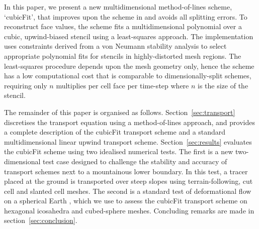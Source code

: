 In this paper, we present a new multidimensional method-of-lines scheme, `cubicFit', that improves upon the scheme in \citep{weller-shahrokhi2014} and avoids all splitting errors.  To reconstruct face values, the scheme fits a multidimensional polynomial over a cubic, upwind-biased stencil using a least-squares approach.  The implementation uses constraints derived from a von Neumann stability analysis to select appropriate polynomial fits for stencils in highly-distorted mesh regions.  The least-squares procedure depends upon the mesh geometry only, hence the scheme has a low computational cost that is comparable to dimensionally-split schemes, requiring only $n$ multiplies per cell face per time-step where $n$ is the size of the stencil.

The remainder of this paper is organised as follows.
Section~\ref{sec:transport} discretises the transport equation using a method-of-lines approach, and provides a complete description of the cubicFit transport scheme and a standard multidimensional linear upwind transport scheme.  Section~\ref{sec:results} evaluates the cubicFit scheme using two  idealised numerical tests.
The first is a new two-dimensional test case designed to challenge the stability and accuracy of transport schemes next to a mountainous lower boundary.  In this test, a tracer placed at the ground is transported over steep slopes using terrain-following, cut cell and slanted cell meshes.
The second is a standard test of deformational flow on a spherical Earth \citep{lauritzen2012}, which we use to assess the cubicFit transport scheme on hexagonal icosahedra and cubed-sphere meshes.
Concluding remarks are made in section~\ref{sec:conclusion}.






